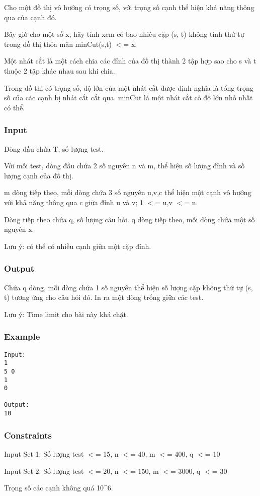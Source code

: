 



   Cho một đồ thị vô hướng có trọng số, với trọng số cạnh thể hiện khả năng thông qua của cạnh đó.  

   Bây giờ cho một số x, hãy tính xem có bao nhiêu cặp (s, t) không tính thứ tự trong đồ thị thỏa mãn minCut(s,t) $<$= x.  

   Một nhát cắt là một cách chia các đỉnh của đồ thị thành 2 tập hợp sao cho s và t thuộc 2 tập khác nhau sau khi chia.  

   Trong đồ thị có trọng số, độ lớn của một nhát cắt được định nghĩa là tổng trọng số của các cạnh bị nhát cắt cắt qua. minCut là một nhát cắt có độ lớn nhỏ nhất có thể.  

\subsubsection{   Input  }

   Dòng đầu chứa T, số lượng test.  

   Với mỗi test, dòng đầu chứa 2 số nguyên n và m, thể hiện số lượng đỉnh và số lượng cạnh của đồ thị.  

   m dòng tiếp theo, mỗi dòng chứa 3 số nguyên u,v,c thể hiện một cạnh vô hướng với khả năng thông qua c giữa đỉnh u và v; 1 $<$= u,v $<$= n.  

   Dòng tiếp theo chứa q, số lượng câu hỏi. q dòng tiếp theo, mỗi dòng chứa một số nguyên x.  

   Lưu ý: có thể có nhiều cạnh giữa một cặp đỉnh.  

\subsubsection{   Output  }

   Chứa q dòng, mỗi dòng chứa 1 số nguyên thể hiện số lượng cặp không thứ tự (s, t) tương ứng cho câu hỏi đó. In ra một dòng trống giữa các test.  

   Lưu ý: Time limit cho bài này khá chặt.  

\subsubsection{   Example  }
\begin{verbatim}
Input:
1
5 0
1
0

Output:
10
\end{verbatim}

\subsubsection{   Constraints  }

   Input Set 1: Số lượng test $<$= 15, n $<$= 40, m $<$= 400, q $<$= 10  

   Input Set 2: Số lượng test $<$= 20, n $<$= 150, m $<$= 3000, q $<$= 30  

   Trọng số các cạnh không quá 10\textasciicircum6.  